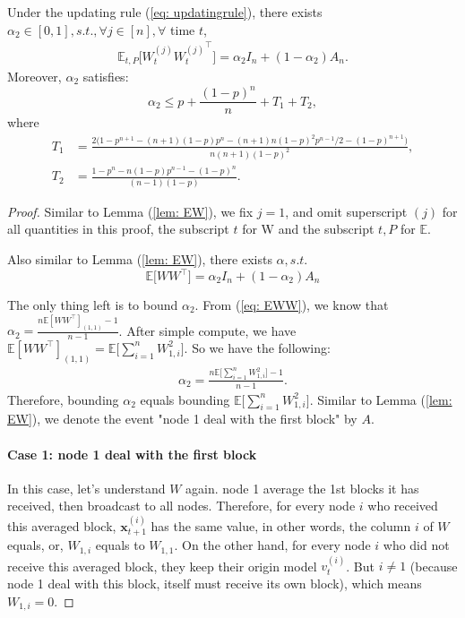 \begin{lemma} \label{lem: EWW}
	Under the updating rule (\ref{eq: updatingrule}), there exists $\alpha_2\in [0,1], s.t.,  \forall j\in [n], \forall$ time $t$, 
	\begin{align*}
		\mathbb{E}_{t,P} \Big[W_t^{(j)}{W_t^{(j)}}^{\top}\Big] = \alpha_2 I_n + (1-\alpha_2)A_n.
	\end{align*}
	Moreover, $\alpha_2$ satisfies:
	\begin{equation*}
	 	\alpha_2 \le p + \frac{(1-p)^n}{n} + T_1 + T_2,
	\end{equation*}
	where
	\begin{align*}
		T_1 &= \frac{2\big(1-p^{n+1}-(n+1)(1-p)p^n - (n+1)n(1-p)^2p^{n-1}/2 - (1-p)^{n+1}\big)}{n(n+1)(1-p)^2},\\
		T_2 &=\frac{1-p^n-n(1-p)p^{n-1}-(1-p)^n}{(n-1)(1-p)}.
	\end{align*}
\begin{proof}
Similar to Lemma (\ref{lem: EW}), we fix $j=1$, and omit superscript $(j)$ for all quantities in this proof, the subscript $t$ for W and the subscript $t,P$ for $\mathbb{E}$.

Also similar to Lemma (\ref{lem: EW}), there exists $\alpha, s.t.$
\begin{equation} \label{eq: EWW}
	\mathbb{E} \big[WW^{\top}\big] = \alpha_2I_n + (1-\alpha_2)A_n
\end{equation}

The only thing left is to bound $\alpha_2$. From (\ref{eq: EWW}), we know that $\alpha_2 = \frac{n\mathbb{E}[WW^{\top}]_{(1,1)}-1}{n-1}$. After simple compute, we have $\mathbb{E}[WW^{\top}]_{(1,1)} = \mathbb{E} \Big[\sum\limits_{i=1}^n W_{1,i}^2\Big]$. So we have the following:
\begin{align*}
	\alpha_2 = \frac{n\mathbb{E} \Big[\sum\limits_{i=1}^n W_{1,i}^2\Big]-1}{n-1}.
\end{align*}
 Therefore, bounding $\alpha_2$ equals bounding $\mathbb{E} \Big[\sum\limits_{i=1}^n W_{1,i}^2\Big]$. Similar to Lemma (\ref{lem: EW}), we denote the event "node 1 deal with the first block" by $A$.

 \paragraph{Case 1: node 1 deal with the first block}  In this case, let's understand $W$ again. node 1 average the 1st blocks it has received, then broadcast to all nodes. Therefore, for every node $i$ who received this averaged block, $\bm{x}_{t+1}^{(i)}$ has the same value, in other words, the column $i$ of $W$ equals, or, $W_{1,i}$ equals to $W_{1,1}$.  On the other hand, for every node $i$ who did not receive this averaged block, they keep their origin model $v_t^{(i)}$. But $i\not=1$ (because node 1 deal with this block, itself must receive its own block), which means $W_{1,i} = 0$.
 

\end{proof}
\end{lemma}
